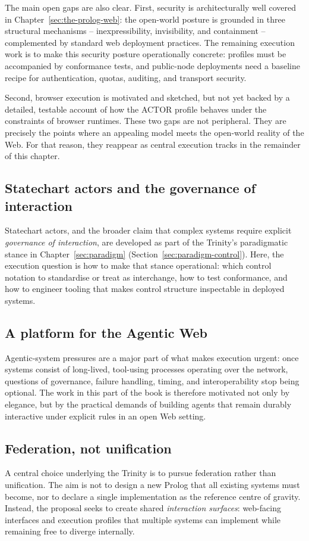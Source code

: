 The main open gaps are also clear. First, security is architecturally well covered in Chapter~\ref{sec:the-prolog-web}: the open-world posture is grounded in three structural mechanisms -- inexpressibility, invisibility, and containment -- complemented by standard web deployment practices. The remaining execution work is to make this security posture operationally concrete: profiles must be accompanied by conformance tests, and public-node deployments need a baseline recipe for authentication, quotas, auditing, and transport security.

Second, browser execution is motivated and sketched, but not yet backed by a detailed, testable account of how the ACTOR profile behaves under the constraints of browser runtimes. These two gaps are not peripheral. They are precisely the points where an appealing model meets the open-world reality of the Web. For that reason, they reappear as central execution tracks in the remainder of this chapter.

\subsection{Statechart actors and the governance of interaction}\label{sec:vision-statecharts-governance}
Statechart actors, and the broader claim that complex systems require explicit
\emph{governance of interaction}, are developed as part of the Trinity's
paradigmatic stance in Chapter~\ref{sec:paradigm}
(Section~\ref{sec:paradigm-control}). Here, the execution question is how to
make that stance operational: which control notation to standardise or treat as
interchange, how to test conformance, and how to engineer tooling that makes
control structure inspectable in deployed systems.

\subsection{A platform for the Agentic Web}\label{sec:vision-agentic-web-platform}
Agentic-system pressures are a major part of what makes execution urgent: once
systems consist of long-lived, tool-using processes operating over the network,
questions of governance, failure handling, timing, and interoperability stop
being optional. The work in this part of the book is therefore motivated not
only by elegance, but by the practical demands of building agents that remain
durably interactive under explicit rules in an open Web setting.

\subsection{Federation, not unification}\label{sec:vision-federation-not-unification}
A central choice underlying the Trinity is to pursue federation rather than unification. The aim is not to design a new Prolog that all existing systems must become, nor to declare a single implementation as the reference centre of gravity. Instead, the proposal seeks to create shared \emph{interaction surfaces}: web-facing interfaces and execution profiles that multiple systems can implement while remaining free to diverge internally.

